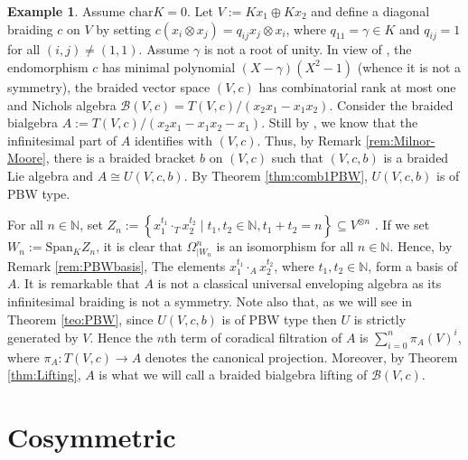 \documentclass[english]{amsart}
\numberwithin{equation}{section}
\numberwithin{figure}{section}
\theoremstyle{plain}
\theoremstyle{definition}
\theoremstyle{definition}
\newtheorem{example}[thm]{Example}
\theoremstyle{remark}
\theoremstyle{remark}
\theoremstyle{plain}
\theoremstyle{plain}
\theoremstyle{plain}
\begin{document}
\begin{example}
\label{exa:PBWbasis-Stumbo}Assume $\mathrm{char}K=0$. Let $V:=Kx_{1}\oplus Kx_{2}$
and define a diagonal braiding $c$ on $V$ by setting $c(x_{i}\otimes x_{j})=q_{ij}x_{j}\otimes x_{i}$,
where $q_{11}=\gamma\in K$ and $q_{ij}=1$ for all $(i,j)\neq(1,1)$.
Assume $\gamma$ is not a root of unity. In view of \cite[Example 9.8]{Ardizzoni-Universal},
the endomorphism $c$ has minimal polynomial $(X-\gamma)(X^{2}-1)$
(whence it is not a symmetry), the braided vector space $(V,c)$ has
combinatorial rank at most one and Nichols algebra $\mathcal{B}\left(V,c\right)=T(V,c)/(x_{2}x_{1}-x_{1}x_{2})$.
Consider the braided bialgebra $A:=T(V,c)/(x_{2}x_{1}-x_{1}x_{2}-x_{1})$.
Still by \cite[Example 9.8]{Ardizzoni-Universal}, we know that the
infinitesimal part of $A$ identifies with $(V,c)$. Thus, by Remark
\ref{rem:Milnor-Moore}, there is a braided bracket $b$ on $(V,c)$
such that $(V,c,b)$ is a braided Lie algebra and $A\cong U(V,c,b)$.
By Theorem \ref{thm:comb1PBW}, $U(V,c,b)$ is of PBW type.

For all $n\in\mathbb{N}$, set $Z_{n}:=\left\{ x_{1}^{t_{1}}\cdot_{T}x_{2}^{t_{2}}\mid t_{1},t_{2}\in\mathbb{N},t_{1}+t_{2}=n\right\} \subseteq V^{\otimes n}$
. If we set $W_{n}:=\mathrm{Span}{}_{K}Z_{n}$, it is clear that $\Omega_{\mid W_{n}}^{n}$
is an isomorphism for all $n\in\mathbb{N}$. Hence, by Remark \ref{rem:PBWbasis},
The elements $x_{1}^{t_{1}}\cdot_{A}x_{2}^{t_{2}}$, where $t_{1},t_{2}\in\mathbb{N}$,
form a basis of $A$. It is remarkable that $A$ is not a classical
universal enveloping algebra as its infinitesimal braiding is not
a symmetry. Note also that, as we will see in Theorem
\ref{teo:PBW}, since $U(V,c,b)$ is of PBW type then $U$ is strictly generated by $V$. Hence
the $n$th term of coradical filtration of $A$ is $\sum_{i=0}^{n}\pi_{A}\left(V\right)^{i}$,
where $\pi_{A}:T(V,c)\rightarrow A$ denotes the canonical projection.
Moreover, by Theorem \ref{thm:Lifting}, $A$ is what we will call a braided bialgebra
lifting of $\mathcal{B}\left(V,c\right)$.\end{example}






\section{Cosymmetric \label{sec:Cosymm}}
\end{document}
